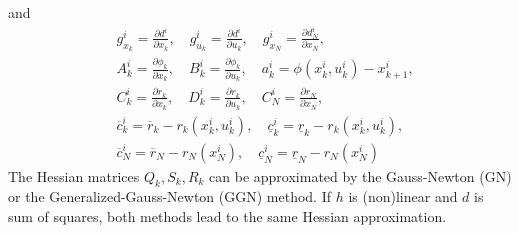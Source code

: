 \documentclass{article}
\begin{document}
and
\begin{equation}\label{QP data}
\begin{aligned}
&g_{x_k}^i = \frac{\partial d^i}{\partial x_k},\quad g_{u_k}^i = \frac{\partial d^i}{\partial u_k},\quad g_{x_N}^i = \frac{\partial d^i_N}{\partial x_N},\\
&A_k^i=\frac{\partial \phi_k}{\partial x_k}, \quad B_k^i=\frac{\partial \phi_k}{\partial u_k},\quad a_k^i = \phi(x_k^i,u_k^i)-x_{k+1}^i,\\
&C_k^i=\frac{\partial r_k}{\partial x_k}, \quad D_k^i=\frac{\partial r_k}{\partial u_k},\quad C_N^i=\frac{\partial r_N}{\partial x_N},\\
&\overline{c}_k^i=\overline{r}_k-r_k(x_k^i,u_k^i),\quad  \underline{c}_k^i=\underline{r}_k-r_k(x_k^i,u_k^i),\\
&\overline{c}_N^i=\overline{r}_N-r_N(x_N^i),\quad  \underline{c}_N^i=\underline{r}_N-r_N(x_N^i)
\end{aligned}
\end{equation}
The Hessian matrices $Q_k,S_k,R_k$ can be approximated by the Gauss-Newton (GN) or the Generalized-Gauss-Newton (GGN) method. If $h$ is (non)linear and $d$ is sum of squares, both methods lead to the same Hessian approximation.
\end{document}
